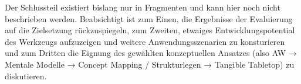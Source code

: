 \todo Der Schlussteil existiert bislang nur in Fragmenten und kann hier noch nicht beschrieben werden. Beabsichtigt ist zum Einen, die Ergebnisse der Evaluierung auf die Zielsetzung rückzuspiegeln, zum Zweiten, etwaiges Entwicklungspotential des Werkzeugs aufzuzeigen und weitere Anwendungsszenarien zu konsturieren und zum Dritten die Eignung des gewählten konzeptuellen Ansatzes (also AW → Mentale Modelle → Concept Mapping / Strukturlegen → Tangible Tabletop) zu diskutieren.

